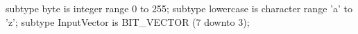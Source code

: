 subtype byte is integer range 0 to 255;
subtype lowercase is character range 'a' to 'z';
subtype InputVector is BIT_VECTOR (7 downto 3);
